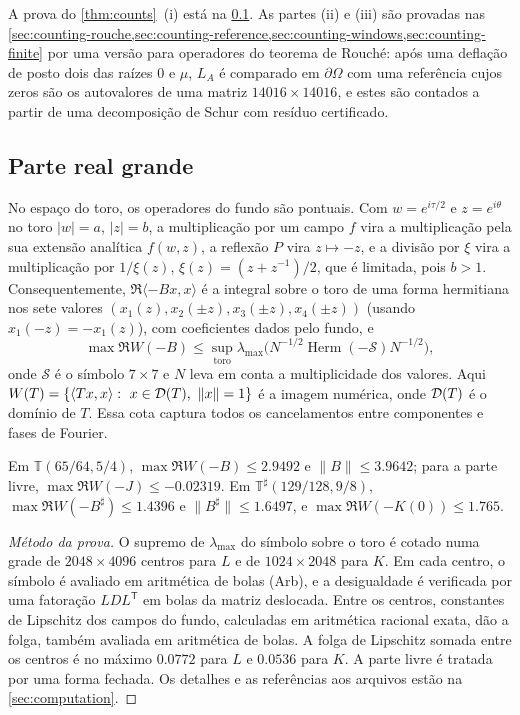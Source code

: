 A prova do \cref{thm:counts}~(i) está na \cref{sec:counting-large}. As partes (ii) e (iii) são provadas nas
\cref{sec:counting-rouche,sec:counting-reference,sec:counting-windows,sec:counting-finite} por uma
versão para operadores do teorema de Rouch\'e: após uma deflação de posto dois das raízes $0$ e $\mu$, $L_A$ é
comparado em $\partial\Omega$ com uma referência cujos zeros são os autovalores de uma matriz $14016\times14016$,
e estes são contados a partir de uma decomposição de Schur com resíduo certificado.

\subsection{Parte real grande}\label{sec:counting-large}

No espaço do toro, os operadores do fundo são pontuais. Com $w=e^{i\tau/2}$ e $z=e^{i\theta}$ no
toro $|w|=a$, $|z|=b$, a multiplicação por um campo $f$ vira a multiplicação pela sua extensão analítica
$f(w,z)$, a reflexão $P$ vira $z\mapsto-z$, e a divisão por $\xi$ vira a multiplicação por
$1/\xi(z)$, $\xi(z)=(z+z^{-1})/2$, que é limitada, pois $b>1$. Consequentemente,
$\Re\langle -Bx,x\rangle$ é a integral sobre o toro de uma forma hermitiana nos sete valores
$(x_1(z),x_2(\pm z),x_3(\pm z),x_4(\pm z))$ (usando $x_1(-z)=-x_1(z)$), com coeficientes dados pelo fundo,
e
\[
  \max\Re W(-B)\le\sup_{\text{toro}}\lambda_{\max}\big(N^{-1/2}\operatorname{Herm}(-\mathcal S)N^{-1/2}\big),
\]
onde $\mathcal S$ é o símbolo $7\times7$ e $N$ leva em conta a multiplicidade dos valores. Aqui
$W(T)=\{\langle Tx,x\rangle:\ x\in\Dom(T),\ \|x\|=1\}$ é a imagem numérica, onde $\mathcal{D}(T)$ é o domínio
de $T$. Essa cota captura todos os cancelamentos
entre componentes e fases de Fourier.

\begin{lemma}\label{lem:F3}
Em $\mathbb T(65/64,5/4)$, $\max\Re W(-B)\le2.9492$ e $\|B\|\le3.9642$; para a parte livre,
$\max\Re W(-J)\le-0.02319$. Em $\mathbb T^\sharp(129/128,9/8)$, $\max\Re W(-B^\sharp)\le1.4396$ e
$\|B^\sharp\|\le1.6497$, e $\max\Re W(-K(0))\le 1.765$.
\end{lemma}

\begin{proof}[Método da prova]
O supremo de $\lambda_{\max}$ do símbolo sobre o toro é cotado numa grade de $2048\times4096$
centros para $L$ e de $1024\times2048$ para $K$. Em cada centro, o símbolo é avaliado em aritmética de bolas (Arb), e a desigualdade é verificada por uma
fatoração $LDL^{\mathsf T}$ em bolas da matriz deslocada. Entre os centros, constantes de Lipschitz dos
campos do fundo, calculadas em aritmética racional exata, dão a folga, também avaliada em aritmética de bolas.
A folga de Lipschitz somada entre os centros é no máximo $0.0772$ para $L$ e $0.0536$ para $K$. A parte livre é tratada por uma forma
fechada. Os detalhes e as referências aos arquivos estão na \cref{sec:computation}.
\end{proof}

